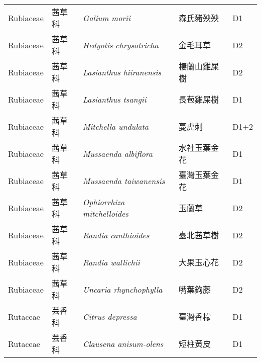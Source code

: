 {\begin{longtable}{p{2.5cm}p{2.5cm}p{4.5cm}p{2.5cm}p{3cm}}
    Rubiaceae & 茜草科 & \textit{Galium morii}  & 森氏豬殃殃 & D1 \index{Galium@\textit{Galium}!morii@\textit{morii}}  \index{森氏豬殃殃} \\
    Rubiaceae & 茜草科 & \textit{Hedyotis chrysotricha}  & 金毛耳草 & D2 \index{Hedyotis@\textit{Hedyotis}!chrysotricha@\textit{chrysotricha}}  \index{金毛耳草} \\
    Rubiaceae & 茜草科 & \textit{Lasianthus hiiranensis}  & 棲蘭山雞屎樹 & D2 \index{Lasianthus@\textit{Lasianthus}!hiiranensis@\textit{hiiranensis}}  \index{棲蘭山雞屎樹} \\
    Rubiaceae & 茜草科 & \textit{Lasianthus tsangii}  & 長苞雞屎樹 & D1 \index{Lasianthus@\textit{Lasianthus}!tsangii@\textit{tsangii}}  \index{長苞雞屎樹} \\
    Rubiaceae & 茜草科 & \textit{Mitchella undulata}  & 蔓虎刺 & D1+2 \index{Mitchella@\textit{Mitchella}!undulata@\textit{undulata}}  \index{蔓虎刺} \\
    Rubiaceae & 茜草科 & \textit{Mussaenda albiflora}  & 水社玉葉金花 & D1 \index{Mussaenda@\textit{Mussaenda}!albiflora@\textit{albiflora}}  \index{水社玉葉金花} \\
    Rubiaceae & 茜草科 & \textit{Mussaenda taiwanensis}  & 臺灣玉葉金花 & D1 \index{Mussaenda@\textit{Mussaenda}!taiwanensis@\textit{taiwanensis}}  \index{臺灣玉葉金花} \\
    Rubiaceae & 茜草科 & \textit{Ophiorrhiza mitchelloides}  & 玉蘭草 & D2 \index{Ophiorrhiza@\textit{Ophiorrhiza}!mitchelloides@\textit{mitchelloides}}  \index{玉蘭草} \\
    Rubiaceae & 茜草科 & \textit{Randia canthioides}  & 臺北茜草樹 & D2 \index{Randia@\textit{Randia}!canthioides@\textit{canthioides}}  \index{臺北茜草樹} \\
    Rubiaceae & 茜草科 & \textit{Randia wallichii}  & 大果玉心花 & D2 \index{Randia@\textit{Randia}!wallichii@\textit{wallichii}}  \index{大果玉心花} \\
    Rubiaceae & 茜草科 & \textit{Uncaria rhynchophylla}  & 嘴葉鉤藤 & D2 \index{Uncaria@\textit{Uncaria}!rhynchophylla@\textit{rhynchophylla}}  \index{嘴葉鉤藤} \\
    Rutaceae & 芸香科 & \textit{Citrus depressa}  & 臺灣香檬 & D1 \index{Citrus@\textit{Citrus}!depressa@\textit{depressa}}  \index{臺灣香檬} \\
    Rutaceae & 芸香科 & \textit{Clausena anisum-olens}  & 短柱黃皮 & D1 \index{Clausena@\textit{Clausena}!anisum-olens@\textit{anisum-olens}}  \index{短柱黃皮} \\

\end{longtable}}
